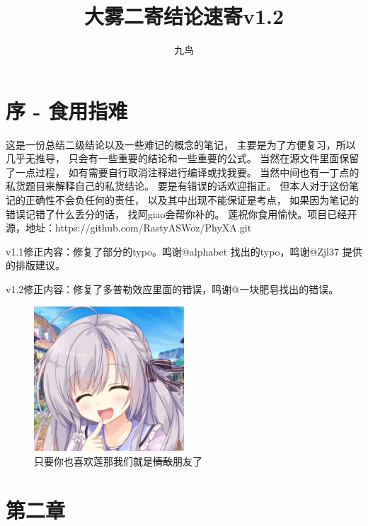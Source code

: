 \documentclass{ctexart}
\author{九鸟}
\title{大雾二寄结论速寄v1.2}
\date{}
\begin{document}
\maketitle
\section{序 - 食用指难}
这是一份总结二级结论以及一些难记的概念的笔记，
主要是为了方便复习，所以几乎无推导，
只会有一些重要的结论和一些重要的公式。
当然在源文件里面保留了一点过程，
如有需要自行取消注释进行编译或找我要。
当然中间也有一丁点的私货题目来解释自己的私货结论。
要是有错误的话欢迎指正。
但本人对于这份笔记的正确性不会负任何的责任，
以及其中出现不能保证是考点，
如果因为笔记的错误记错了什么丢分的话，
找阿giao会帮你补的。
莲祝你食用愉快。项目已经开源，地址：https://github.com/RastyASWoz/PhyXA.git


v1.1修正内容：修复了部分的typo。鸣谢@alphabet 找出的typo，鸣谢@Zjl37 提供的排版建议。


v1.2修正内容：修复了多普勒效应里面的错误，鸣谢@一块肥皂找出的错误。
\begin{figure}[H]
    \centering
    \includegraphics[width=0.5\textwidth]{img/lian.jpg}
    \caption[ ]{只要你也喜欢莲那我们就是\sout{情敌}朋友了}
\end{figure}
\section{第二章}
\end{document}
